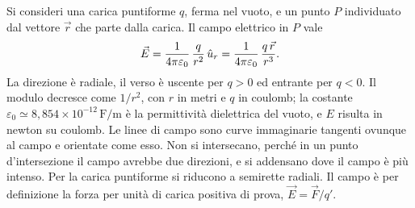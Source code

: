 \documentclass[11pt,a4paper]{article}
\begin{document}

Si consideri una carica puntiforme $q$, ferma nel vuoto, e un punto $P$ individuato dal vettore $\vec r$ che parte dalla carica. Il campo elettrico in $P$ vale
\[
\vec E=\frac{1}{4\pi\varepsilon_0}\,\frac{q}{r^2}\,\hat{u}_r=\frac{1}{4\pi\varepsilon_0}\,\frac{q\,\vec r}{r^3}.
\]
La direzione è radiale, il verso è uscente per $q>0$ ed entrante per $q<0$. Il modulo decresce come $1/r^2$, con $r$ in metri e $q$ in coulomb; la costante $\varepsilon_0\simeq\ensuremath{8{,}854\times10^{-12}\,\mathrm{F/m}}$ è la permittività dielettrica del vuoto, e $E$ risulta in newton su coulomb. Le linee di campo sono curve immaginarie tangenti ovunque al campo e orientate come esso. Non si intersecano, perché in un punto d'intersezione il campo avrebbe due direzioni, e si addensano dove il campo è più intenso. Per la carica puntiforme si riducono a semirette radiali. Il campo è per definizione la forza per unità di carica positiva di prova, $\vec E=\vec F/q'$.
\end{document}
